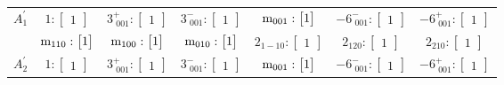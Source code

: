 \documentclass[fleqn,8pt,landscape]{jsarticle}
\begin{document}
\begin{longtable}{ccccccc}
$ A_{1}^{\prime} $ & $ 1:\begin{bmatrix} 1 \end{bmatrix} $ & $ 3^{+}_{\,\,001}:\begin{bmatrix} 1 \end{bmatrix} $ & $ 3^{-}_{\,\,001}:\begin{bmatrix} 1 \end{bmatrix} $ & $ {\rm m}_{001}:\begin{bmatrix} 1 \end{bmatrix} $ & $ -6^{-}_{\,\,001}:\begin{bmatrix} 1 \end{bmatrix} $ & $ -6^{+}_{\,\,001}:\begin{bmatrix} 1 \end{bmatrix} $ \\
& $ {\rm m}_{110}:\begin{bmatrix} 1 \end{bmatrix} $ & $ {\rm m}_{100}:\begin{bmatrix} 1 \end{bmatrix} $ & $ {\rm m}_{010}:\begin{bmatrix} 1 \end{bmatrix} $ & $ 2{}_{1-10}:\begin{bmatrix} 1 \end{bmatrix} $ & $ 2{}_{120}:\begin{bmatrix} 1 \end{bmatrix} $ & $ 2{}_{210}:\begin{bmatrix} 1 \end{bmatrix} $ \\ \hline
$ A_{2}^{\prime} $ & $ 1:\begin{bmatrix} 1 \end{bmatrix} $ & $ 3^{+}_{\,\,001}:\begin{bmatrix} 1 \end{bmatrix} $ & $ 3^{-}_{\,\,001}:\begin{bmatrix} 1 \end{bmatrix} $ & $ {\rm m}_{001}:\begin{bmatrix} 1 \end{bmatrix} $ & $ -6^{-}_{\,\,001}:\begin{bmatrix} 1 \end{bmatrix} $ & $ -6^{+}_{\,\,001}:\begin{bmatrix} 1 \end{bmatrix} $ \\

\end{longtable}
\end{document}
